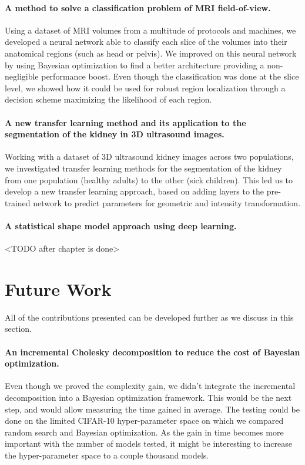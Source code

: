 \paragraph*{A method to solve a classification problem of MRI field-of-view.}
Using a dataset of MRI volumes from a multitude of protocols and machines, we developed a neural network able to classify each slice of the volumes into their anatomical regions (such as head or pelvis). We improved on this neural network by using Bayesian optimization to find a better architecture providing a non-negligible performance boost. Even though the classification was done at the slice level, we showed how it could be used for robust region localization through a decision scheme maximizing the likelihood of each region.

\paragraph*{A new transfer learning method and its application to the segmentation of the kidney in 3D ultrasound images.}
Working with a dataset of 3D ultrasound kidney images across two populations, we investigated transfer learning methods for the segmentation of the kidney from one population (healthy adults) to the other (sick children). This led us to develop a new transfer learning approach, based on adding layers to the pre-trained network to predict parameters for geometric and intensity transformation. 

\paragraph*{A statistical shape model approach using deep learning.}
<TODO after chapter is done> 

\section{Future Work}

All of the contributions presented can be developed further as we discuss in this section.

\paragraph*{An incremental Cholesky decomposition to reduce the cost of Bayesian optimization.}
Even though we proved the complexity gain, we didn't integrate the incremental decomposition into a Bayesian optimization framework. This would be the next step, and would allow measuring the time gained in average. The testing could be done on the limited CIFAR-10 hyper-parameter space on which we compared random search and Bayesian optimization. As the gain in time becomes more important with the number of models tested, it might be interesting to increase the hyper-parameter space to a couple thousand models.

